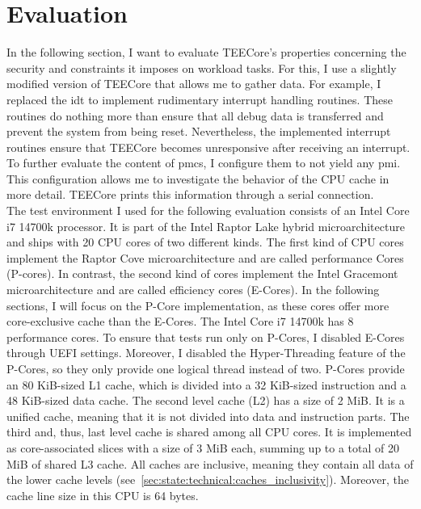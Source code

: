 \chapter{Evaluation}
\label{sec:evaluation}


In the following section, I want to evaluate TEECore's properties concerning the
security and constraints it imposes on workload tasks. For this, I use a
slightly modified version of TEECore that allows me to gather data. For example,
I replaced the \gls{idt} to implement rudimentary interrupt handling routines.
These routines do nothing more than ensure that all debug data is transferred
and prevent the system from being reset. Nevertheless, the implemented interrupt
routines ensure that TEECore becomes unresponsive after receiving an interrupt.
To further evaluate the content of \glspl{pmc}, I configure them to not yield
any \gls{pmi}. This configuration allows me to investigate the behavior of the
CPU cache in more detail. TEECore prints this information through a serial
connection.\\

The test environment I used for the following evaluation consists of an Intel
Core i7 14700k processor. It is part of the Intel Raptor Lake hybrid
microarchitecture and ships with 20 CPU cores of two different kinds. The first
kind of CPU cores implement the Raptor Cove microarchitecture and are called
performance Cores (P-cores). In contrast, the second kind of cores implement the
Intel Gracemont microarchitecture and are called efficiency cores (E-Cores). In
the following sections, I will focus on the P-Core implementation, as these
cores offer more core-exclusive cache than the E-Cores. The Intel Core i7 14700k
has 8 performance cores. To ensure that tests run only on P-Cores, I disabled
E-Cores through UEFI settings. Moreover, I disabled the Hyper-Threading feature
of the P-Cores, so they only provide one logical thread instead of two. P-Cores
provide an 80 KiB-sized L1 cache, which is divided into a 32 KiB-sized
instruction and a 48 KiB-sized data cache. The second level cache (L2) has a
size of 2 MiB. It is a unified cache, meaning that it is not divided into data
and instruction parts. The third and, thus, last level cache is shared among all
CPU cores. It is implemented as core-associated slices with a size of 3 MiB
each, summing up to a total of 20 MiB of shared L3 cache. All caches are
inclusive, meaning they contain all data of the lower cache levels
(see~\ref{sec:state:technical:caches_inclusivity}). Moreover, the cache line
size in this CPU is 64 bytes.

